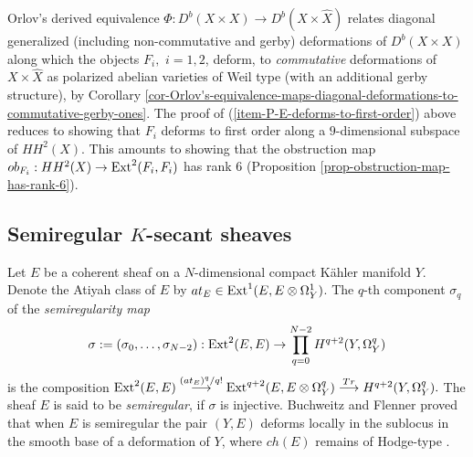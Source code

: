\documentclass[12pt]{amsart}
\numberwithin{equation}{subsection}
\theoremstyle{plain}
\theoremstyle{definition}
\newcommand{\LongRightArrowOf}[1]{\stackrel{#1}{\longrightarrow}}
\newcommand{\Ext}{{\rm Ext}}
\begin{document}
Orlov's derived equivalence $\Phi:D^b(X\times X)\rightarrow D^b(X\times\hat{X})$ relates diagonal generalized (including non-commutative and gerby) deformations of $D^b(X\times X)$ along which the objects $F_i,$ $i=1,2$, deform,
to {\em commutative} deformations of $X\times\hat{X}$ as polarized abelian varieties of Weil type (with an additional gerby structure), by 
Corollary \ref{cor-Orlov's-equivalence-maps-diagonal-deformations-to-commutative-gerby-ones}. The proof of (\ref{item-P-E-deforms-to-first-order}) above reduces to showing that $F_i$ deforms to first order along a $9$-dimensional subspace of $HH^2(X)$. This amounts to showing that the obstruction map $ob_{F_i}:HH^2(X)\rightarrow \Ext^2(F_i,F_i)$ has rank $6$ (Proposition \ref{prop-obstruction-map-has-rank-6}).

% 
\subsection{Semiregular $K$-secant sheaves}

Let $E$ be a coherent sheaf on a $N$-dimensional compact K\"{a}hler manifold $Y$. Denote the Atiyah class of $E$ by  $at_E\in \Ext^1(E,E\otimes\Omega^1_Y)$. 
The $q$-th component $\sigma_q$ of the {\em semiregularity map} 
\[
\sigma:=(\sigma_0, \dots,\sigma_{N-2}):\Ext^2(E,E)\rightarrow \prod_{q= 0}^{N-2}H^{q+2}(Y,\Omega^q_Y)
\]
is the composition
$
\Ext^2(E,E)\LongRightArrowOf{(at_E)^q/q!}\Ext^{q+2}(E,E\otimes\Omega^q_Y)\LongRightArrowOf{Tr}H^{q+2}(Y,\Omega^q_Y).
$
The sheaf $E$ is said to be {\em semiregular}, if $\sigma$ is injective. Buchweitz and Flenner proved that when $E$ is semiregular the pair $(Y,E)$ deforms locally in the sublocus in the smooth base of a deformation of $Y$, where $ch(E)$ remains of Hodge-type \cite[Th. 5.1]{buchweitz-flenner}. 
\end{document}
